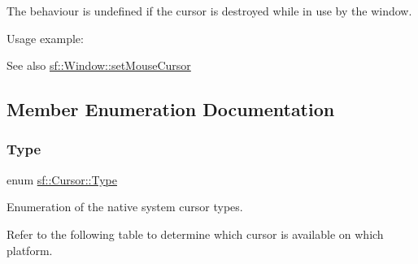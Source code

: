 The behaviour is undefined if the cursor is destroyed while in use by the window.

Usage example\+: 
\begin{DoxyCode}{0}
\DoxyCodeLine{}
\DoxyCodeLine{\textcolor{comment}{// ... create window as usual ...}}
\DoxyCodeLine{}
\end{DoxyCode}


\begin{DoxySeeAlso}{See also}
\mbox{\hyperlink{classsf_1_1_window_aab7a05baece72b08ad120063b143d19b}{sf\+::\+Window\+::set\+Mouse\+Cursor}} \begin{DoxyVerb}\end{DoxyVerb}
 
\end{DoxySeeAlso}


\subsection{Member Enumeration Documentation}
\mbox{\label{classsf_1_1_cursor_ab9ab152aec1f8a4955e34ccae08f930a}} 
\subsubsection{\texorpdfstring{Type}{Type}}
{\footnotesize\ttfamily enum \mbox{\hyperlink{classsf_1_1_cursor_ab9ab152aec1f8a4955e34ccae08f930a}{sf\+::\+Cursor\+::\+Type}}}



Enumeration of the native system cursor types. 

Refer to the following table to determine which cursor is available on which platform.

